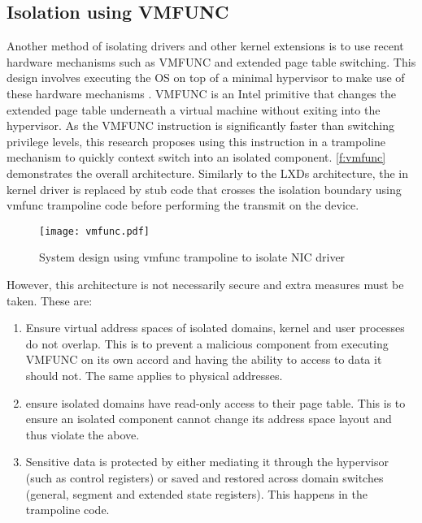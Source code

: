 \subsection{Isolation using VMFUNC}
Another method of isolating drivers and other kernel extensions is to use recent hardware mechanisms such as VMFUNC and
extended page table switching. This design involves executing the OS on top of a minimal hypervisor to make use of 
these hardware mechanisms \cite{Narayanan_HTJB_20}. VMFUNC is an Intel primitive that changes the extended page table
underneath a virtual machine without exiting into the hypervisor. As the VMFUNC instruction is significantly faster than
switching privilege levels, this research proposes using this instruction in a trampoline mechanism to quickly context switch
into an isolated component. \autoref{f:vmfunc} demonstrates the overall architecture. Similarly to the LXDs architecture,
the in kernel driver is replaced by stub code that crosses the isolation boundary using vmfunc trampoline code before
performing the transmit on the device.

\begin{figure}[h]
  \centering
  \texttt{[image: vmfunc.pdf]}
  \caption{System design using vmfunc trampoline to isolate NIC driver}
  \label{f:vmfunc}
\end{figure} 

However, this architecture is not necessarily secure and extra measures must be taken. These are:
\begin{enumerate}
	\item Ensure virtual address spaces of isolated domains, kernel and user processes do not overlap. This is to prevent a 
	malicious component from executing VMFUNC on its own accord and having the ability to access to data it should not. 
	The same applies to physical addresses.
	\item ensure isolated domains have read-only access to their page table. This is to ensure an isolated component cannot
	change its address space layout and thus violate the above.
	\item Sensitive data is protected by either mediating it through the hypervisor (such as control registers) or saved and 
	restored across domain switches (general, segment and extended state registers). This happens in the trampoline code.
\end{enumerate}

